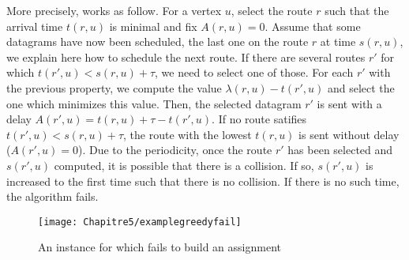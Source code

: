 More precisely, \greedydeadline works as follow. For a vertex $u$, select the route $r$ such that the arrival time $t(r,u)$ is minimal and fix $A(r,u) = 0$. Assume that some datagrams have now been scheduled, the last one on the route $r$ at time $s(r,u)$, we explain here how to schedule the next route.  If there are several routes $r'$ for which $t(r',u) < s(r,u) + \tau $, we need to select one of those. For each $r'$ with the previous property, we compute the value $\lambda(r,u) - t(r',u)$ and select the one which minimizes this value. Then, the selected datagram $r'$ is sent with a delay $A(r',u) = t(r,u) + \tau - t(r',u)$. If no route satifies $t(r',u) < s(r,u) + \tau$, the route with the lowest $t(r,u)$ is sent without delay ($A(r',u) = 0$). 
Due to the periodicity, once the route $r'$ has been selected and $s(r',u)$ computed, it is possible that there is a collision. If so, $s(r',u)$ is increased to the first time such that there is no collision. If there is no such time, the algorithm fails.


%    

   \begin{figure} 
	\centering
	\texttt{[image: Chapitre5/examplegreedyfail]}
\caption{An instance for which \greedydeadline fails to build an assignment}
\label{fig:examplegreedyfail}   
\end{figure}



